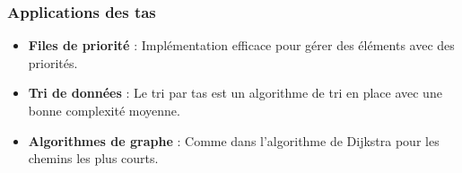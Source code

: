 \subsubsection{Applications des tas}
\begin{itemize}
    \item \textbf{Files de priorité} : Implémentation efficace pour gérer des éléments avec des priorités.
    \item \textbf{Tri de données} : Le tri par tas est un algorithme de tri en place avec une bonne complexité moyenne.
    \item \textbf{Algorithmes de graphe} : Comme dans l'algorithme de Dijkstra pour les chemins les plus courts.
\end{itemize}

\newpage